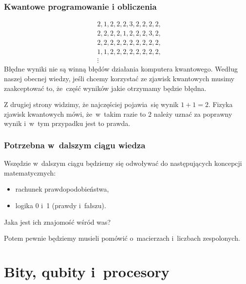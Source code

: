\documentclass[10pt,t]{beamer}
\begin{document}
\begin{frame}
  \frametitle{Kwantowe programowanie i obliczenia}


  \begin{align*}
    &2, 1, 2, 2, 2, 3, 2, 2, 2, 2, \\
    &2, 2, 2, 2, 1, 2, 2, 2, 3, 2, \\
    &2, 2, 2, 2, 2, 2, 2, 2, 2, 2, \\
    &1, 1, 2, 2, 2, 2, 2, 2, 2, 2, \\
    &\vdots
  \end{align*}
  Błędne wyniki \alert{nie} są winną błędów działania komputera
  kwantowego. Według naszej obecnej wiedzy, jeśli chcemy korzystać ze
  zjawisk kwantowych musimy zaakceptować to, że~część wyników jakie
  otrzymamy będzie błędna.

  Z drugiej strony widzimy, że najczęściej pojawia~się wynik
  $1 + 1 = 2$. Fizyka zjawisk kwantowych mówi, że~w~takim razie to $2$
  należy uznać za poprawny wynik i~w~tym przypadku jest to prawda.

\end{frame}





\begin{frame}
  \frametitle{Potrzebna w~dalszym ciągu wiedza}


  Wszędzie w~dalszym ciągu będziemy się odwoływać do następujących
  koncepcji matematycznych:
  \begin{itemize}
  \item rachunek prawdopodobieństwa,

  \item logika 0 i~1 (prawdy i~fałszu).

\end{itemize}
Jaka jest ich znajomość wśród was?

Potem pewnie będziemy musieli pomówić o~macierzach i~liczbach zespolonych.

\end{frame}










\section{Bity, qubity i~procesory}
\end{document}
